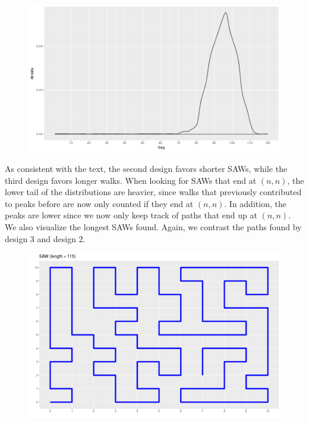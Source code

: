 \documentclass[journal, a4paper]{IEEEtran}
\begin{document}
	\vspace{-2mm}
	
	\begin{figure}[h]
	\begin{center}
		\includegraphics[width = 0.9\columnwidth]{d3}
	\end{center}
	\end{figure}
	
	\vspace{-2mm}
	
	As consistent with the text, the second design favors shorter SAWs, while the third design favors longer walks. When looking for SAWs that end at $(n,n)$,
	the lower tail of the distributions are heavier, since walks that previously contributed to peaks before are now only counted if they end at $(n,n)$. In addition, the peaks are lower since we now only keep track of paths that end up at $(n,n)$. We also visualize the longest SAWs found. Again, we contrast the paths found by design 3 and design 2.
	\vspace{-2mm}
	\begin{figure}[h]
	\begin{center}
		\includegraphics[width = 0.9\columnwidth]{SAW_115}
	\end{center}
	\end{figure}
	
\end{document}
